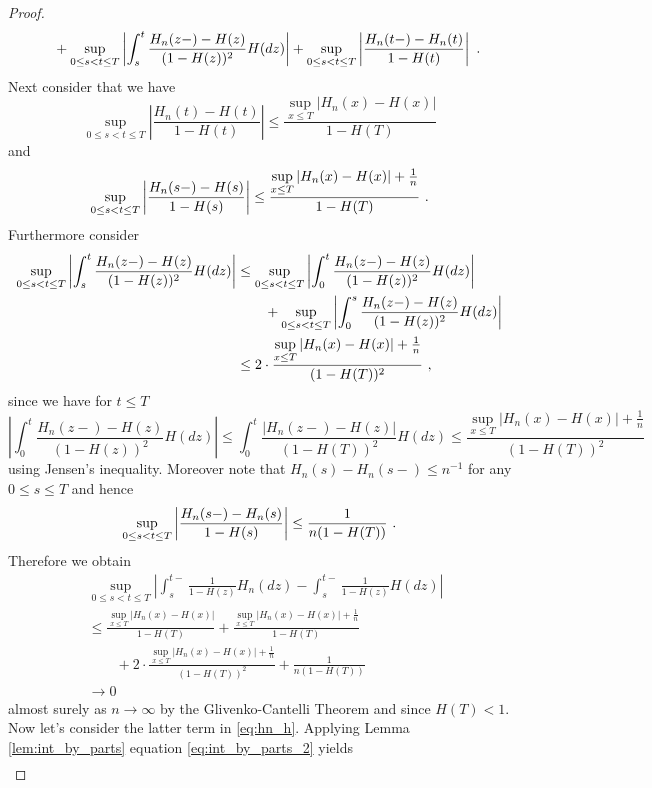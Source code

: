 \begin{lemma}
\begin{proof}
\begin{align*}
		&\qquad + \sup\limits_{0\leq s<t\leq T}\left|\int_s^{t} \frac{H_n(z-) - H(z)}{(1-H(z))^2} H(dz)\right| + \sup\limits_{0\leq s<t\leq T}\left|\frac{H_n(t-) - H_n(t)}{1-H(t)}\right|\textrm{ .}
		\end{align*}
		Next consider that we have
		$$\sup\limits_{0\leq s<t\leq T}\left| \frac{H_n(t) - H(t)}{1-H(t)}\right| \leq \frac{\sup\limits_{x\leq T}\left| H_n(x) - H(x)\right|}{1-H(T)}$$
		and
		$$\sup\limits_{0\leq s<t\leq T}\left| \frac{H_n(s-) - H(s)}{1-H(s)}\right| \leq \frac{\sup\limits_{x\leq T}\left| H_n(x) - H(x)\right| + \frac{1}{n}}{1-H(T)}\textrm{ .}$$
		Furthermore consider
		\begin{align*}
			\sup\limits_{0\leq s<t\leq T}\left|\int_s^{t} \frac{H_n(z-) - H(z)}{(1-H(z))^2} H(dz)\right| &\leq \sup\limits_{0\leq s<t\leq T}\left|\int_0^{t} \frac{H_n(z-) - H(z)}{(1-H(z))^2} H(dz)\right|\\
			&\qquad + \sup\limits_{0\leq s<t\leq T}\left|\int_0^{s} \frac{H_n(z-) - H(z)}{(1-H(z))^2} H(dz)\right|\\
			&\leq 2\cdot \frac{\sup\limits_{x\leq T}\left|H_n(x) - H(x)\right| + \frac{1}{n}}{(1-H(T))^2}\textrm{ ,}
		\end{align*}
		since we have for $t\leq T$
		$$\left|\int_0^{t} \frac{H_n(z-) - H(z)}{(1-H(z))^2} H(dz)\right| \leq \int_0^{t} \frac{\left|H_n(z-) - H(z)\right|}{(1-H(T))^2} H(dz)\leq \frac{\sup\limits_{x\leq T}\left|H_n(x) - H(x)\right| + \frac{1}{n}}{(1-H(T))^2}$$
		using Jensen's inequality. Moreover note that	$H_n(s) - H_n(s-) \leq n^{-1}$ for any $0\leq s \leq T$ and hence
		$$\sup\limits_{0\leq s<t\leq T}\left|\frac{H_n(s-) - H_n(s)}{1-H(s)}\right| \leq \frac{1}{n(1-H(T))}\textrm{ .} $$
		Therefore we obtain
		\begin{align*}
		&\sup\limits_{0\leq s<t\leq T}\left| \int_{s}^{t-} \frac{1}{1-H(z)} H_n(dz) - \int_{s}^{t-} \frac{1}{1-H(z)} H(dz)\right|\\
		&\leq \frac{\sup\limits_{x\leq T}\left| H_n(x) - H(x)\right|}{1-H(T)} + \frac{\sup\limits_{x\leq T}\left| H_n(x) - H(x)\right| + \frac{1}{n}}{1-H(T)} \\
		&\qquad + 2\cdot\frac{\sup\limits_{x\leq T}\left|H_n(x) - H(x)\right| + \frac{1}{n}}{(1-H(T))^2} + \frac{1}{n(1-H(T))}\\
		&\to 0
		\end{align*}
		almost surely as $n\to\infty$ by the Glivenko-Cantelli Theorem and since $H(T)<1$.
		Now let's consider the latter term in \eqref{eq:hn_h}. Applying Lemma \ref{lem:int_by_parts} equation \eqref{eq:int_by_parts_2} yields
		\begin{align*}

\end{align*}
\end{proof}
\end{lemma}
